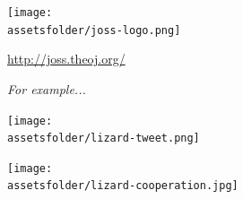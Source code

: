 \documentclass{beamer}
\newcommand{\assetsfolder}{./assets}
\begin{document}
	\begin{frame}
	   \begin{center}
           \texttt{[image: \\assetsfolder/joss-logo.png]}

			\url{http://joss.theoj.org/}
	   \end{center}

	\end{frame}

	\begin{frame}
		\Huge
		\begin{center}
			\textit {For example...}
		\end{center}

	\end{frame}

	\begin{frame}
		\begin{center}
			\texttt{[image: \\assetsfolder/lizard-tweet.png]}
		\end{center}
		\begin{center}
			\pause
			\texttt{[image: \\assetsfolder/lizard-cooperation.jpg]}
		\end{center}





	\end{frame}
\end{document}
